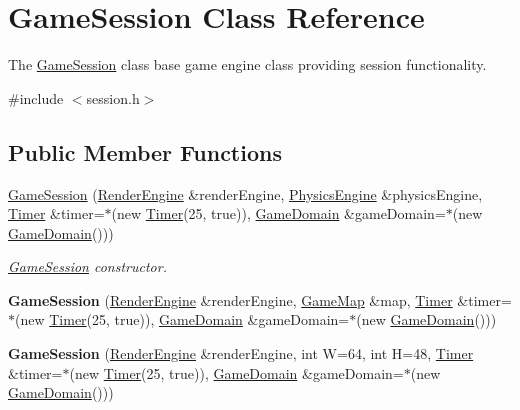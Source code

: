 \hypertarget{classGameSession}{}\section{Game\+Session Class Reference}
\label{classGameSession}


The \hyperlink{classGameSession}{Game\+Session} class base game engine class providing session functionality.  




{\ttfamily \#include $<$session.\+h$>$}

\subsection*{Public Member Functions}
\begin{DoxyCompactItemize}
\item 
\hyperlink{classGameSession_acf86794a6c1bf09cea3862c26179ead7}{Game\+Session} (\hyperlink{classRenderEngine}{Render\+Engine} \&render\+Engine, \hyperlink{classPhysicsEngine}{Physics\+Engine} \&physics\+Engine, \hyperlink{classTimer}{Timer} \&timer=$\ast$(new \hyperlink{classTimer}{Timer}(25, true)), \hyperlink{classGameDomain}{Game\+Domain} \&game\+Domain=$\ast$(new \hyperlink{classGameDomain}{Game\+Domain}()))
\begin{DoxyCompactList}\small\item\em \hyperlink{classGameSession}{Game\+Session} constructor. \end{DoxyCompactList}\item 
\hypertarget{classGameSession_a491ad42d36865d15f9b76871039618b8}{}{\bfseries Game\+Session} (\hyperlink{classRenderEngine}{Render\+Engine} \&render\+Engine, \hyperlink{classGameMap}{Game\+Map} \&map, \hyperlink{classTimer}{Timer} \&timer=$\ast$(new \hyperlink{classTimer}{Timer}(25, true)), \hyperlink{classGameDomain}{Game\+Domain} \&game\+Domain=$\ast$(new \hyperlink{classGameDomain}{Game\+Domain}()))\label{classGameSession_a491ad42d36865d15f9b76871039618b8}

\item 
\hypertarget{classGameSession_a9a0832e191313753703d194a64c90d83}{}{\bfseries Game\+Session} (\hyperlink{classRenderEngine}{Render\+Engine} \&render\+Engine, int W=64, int H=48, \hyperlink{classTimer}{Timer} \&timer=$\ast$(new \hyperlink{classTimer}{Timer}(25, true)), \hyperlink{classGameDomain}{Game\+Domain} \&game\+Domain=$\ast$(new \hyperlink{classGameDomain}{Game\+Domain}()))\label{classGameSession_a9a0832e191313753703d194a64c90d83}


\end{DoxyCompactItemize}
